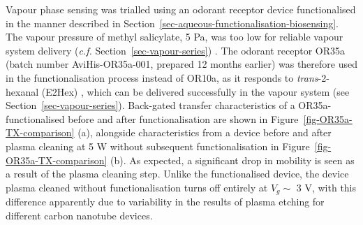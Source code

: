 \documentclass[
  a4paper,
]{scrbook}
\begin{document}
Vapour phase sensing was trialled using an odorant receptor device
functionalised in the manner described in
Section~\ref{sec-aqueous-functionalisation-biosensing}. The vapour
pressure of methyl salicylate, 5 Pa, was too low for reliable vapour
system delivery (\emph{c.f.} Section~\ref{sec-vapour-series})
\autocite{MeSal}. The odorant receptor OR35a (batch number
AviHis-OR35a-001, prepared 12 months earlier) was therefore used in the
functionalisation process instead of OR10a, as it responds to
\emph{trans}-2-hexanal (E2Hex) \autocite{Murugathas2019a}, which can be
delivered successfully in the vapour system (see
Section~\ref{sec-vapour-series}). Back-gated transfer characteristics of
a OR35a-functionalised before and after functionalisation are shown in
Figure~\ref{fig-OR35a-TX-comparison} (a), alongside characteristics from
a device before and after plasma cleaning at 5 W without subsequent
functionalisation in Figure~\ref{fig-OR35a-TX-comparison} (b). As
expected, a significant drop in mobility is seen as a result of the
plasma cleaning step. Unlike the functionalised device, the device
plasma cleaned without functionalisation turns off entirely at
\(V_g \sim\) 3 V, with this difference apparently due to variability in
the results of plasma etching for different carbon nanotube devices.
\end{document}
